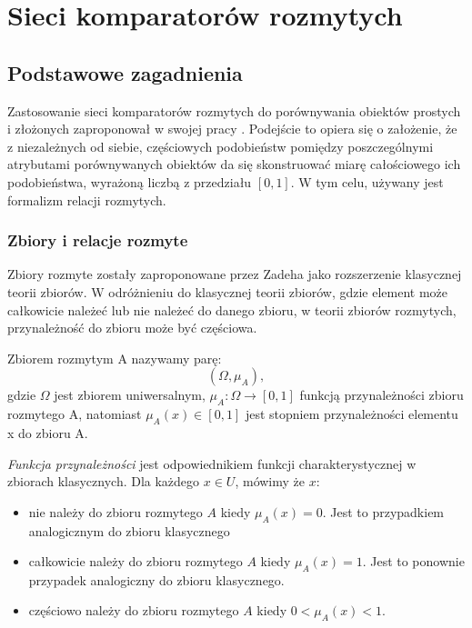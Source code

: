 \documentclass{pracalicmgr}
\begin{document}
	\section{Sieci komparatorów rozmytych}
    \subsection{Podstawowe zagadnienia}
    Zastosowanie sieci komparatorów rozmytych do porównywania obiektów prostych i złożonych zaproponował w swojej pracy \citet{sosnowski:compar}. Podejście to opiera się o założenie, że z niezależnych od siebie, częściowych podobieństw pomiędzy poszczególnymi atrybutami porównywanych obiektów da się skonstruować miarę całościowego ich podobieństwa, wyrażoną liczbą z przedziału $\left[0,1\right]$. W tym celu, używany jest formalizm relacji rozmytych.
    \subsubsection{Zbiory i relacje rozmyte} 
    Zbiory rozmyte zostały zaproponowane przez Zadeha jako rozszerzenie klasycznej teorii zbiorów. W odróżnieniu do klasycznej teorii zbiorów, gdzie element może całkowicie należeć lub nie należeć do danego zbioru, w teorii zbiorów rozmytych, przynależność do zbioru może być częściowa.
    \begin{defn}
        Zbiorem rozmytym A nazywamy parę:
        \begin{equation}
            (\Omega,\mu_A),
        \end{equation}
        gdzie $\Omega$ jest zbiorem uniwersalnym, $\mu_A : \Omega \rightarrow [0,1]$ funkcją przynależności zbioru rozmytego A, natomiast $\mu_A(x) \in [0,1]$ jest stopniem przynależności elementu x do zbioru A.
    \end{defn}
    \textit{Funkcja przynależności} jest odpowiednikiem funkcji charakterystycznej w zbiorach klasycznych. Dla każdego $x \in U$, mówimy że $x$:
    \begin{itemize}
        \item nie należy do zbioru rozmytego $A$ kiedy $\mu_A(x)=0$. Jest to przypadkiem analogicznym do zbioru klasycznego
        \item całkowicie należy do zbioru rozmytego $A$ kiedy $\mu_A(x)=1$. Jest to ponownie przypadek analogiczny do zbioru klasycznego.
        \item częściowo należy do zbioru rozmytego $A$ kiedy $0<\mu_A(x)<1$.
    \end{itemize}
    
\end{document}
